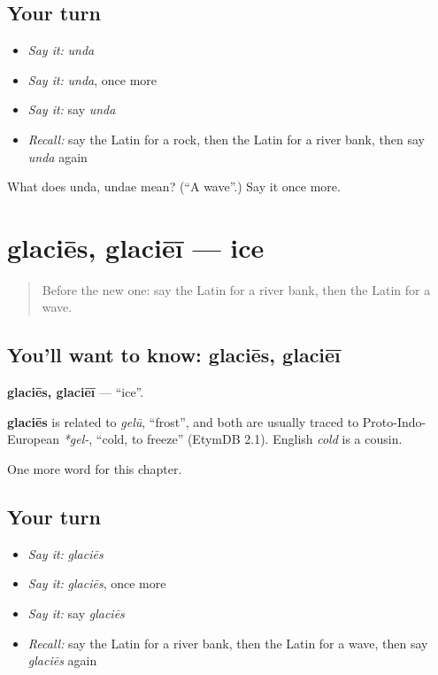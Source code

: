 \subsection*{Your turn}
\begin{itemize}
\raggedright
  \item \emph{Say it:} \emph{unda}
  \item \emph{Say it:} \emph{unda}, once more
  \item \emph{Say it:} say \emph{unda}
  \item \emph{Recall:} say the Latin for a rock, then the Latin for a river bank, then say \emph{unda} again
\end{itemize}

\begin{tcolorbox}[breakable,colback=teal!4,colframe=teal!35!black,title={Before you move on}]
What does unda, undae mean? (\textquotedblleft{}A wave\textquotedblright{}.) Say it once more.
\end{tcolorbox}
\section[glaciēs, glaciēī]{glaciēs, glaciēī — ice}

\label{lesson:LA-C130-glacies}



\begin{quote}
Before the new one: say the Latin for a river bank, then the Latin for a wave.
\end{quote}

\subsection*{You'll want to know: glaciēs, glaciēī}
\textbf{glaciēs, glaciēī} — \textquotedblleft{}ice\textquotedblright{}.

\begin{cousinweb}
\textbf{glaciēs} is related to \emph{gelū}, \textquotedblleft{}frost\textquotedblright{}, and both are usually traced to Proto-Indo-European \emph{*gel-}, \textquotedblleft{}cold, to freeze\textquotedblright{} (EtymDB 2.1). English \emph{cold} is a cousin.
\end{cousinweb}

\begin{grammarlens}[title={What you've built}]
One more word for this chapter.
\end{grammarlens}

\subsection*{Your turn}
\begin{itemize}
\raggedright
  \item \emph{Say it:} \emph{glaciēs}
  \item \emph{Say it:} \emph{glaciēs}, once more
  \item \emph{Say it:} say \emph{glaciēs}
  \item \emph{Recall:} say the Latin for a river bank, then the Latin for a wave, then say \emph{glaciēs} again
\end{itemize}

